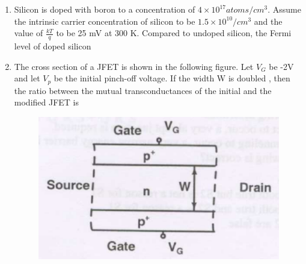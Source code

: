 \documentclass[a4paper, 11pt]{article}
\begin{document}
\begin{enumerate}
    \hfill{}
    
    \item Silicon is doped with boron to a concentration of $4 \times 10^{17} atoms/cm^3$. Assume the intrinsic carrier concentration of silicon to be $1.5 \times 10^{10} /cm^3$ and the value of $\frac{kT}{q}$ to be 25 mV at 300 K. Compared to undoped silicon, the Fermi level of doped silicon
    \begin{enumerate}
    \end{enumerate}
    
    \hfill{}
    
    \item The cross section of a JFET is shown in the following figure. Let $V_G$ be -2V and let $V_p$ be the initial pinch-off voltage. If the width W is doubled , then the ratio between the mutual transconductances of the initial and the modified JFET is
    \begin{figure}[H]
        \centering
        \includegraphics[width=0.6\columnwidth]{q52}
        \caption*{}
        \label{fig:q52}
    \end{figure}
    \begin{enumerate}
    \end{enumerate}
    

\end{enumerate}
\end{document}
